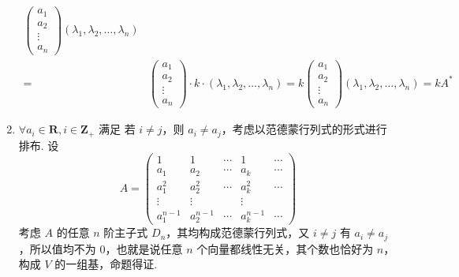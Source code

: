 \begin{enumerate}
\begin{align*}
\begin{pmatrix}
            a_1 \\
            a_2 \\
            \vdots \\
            a_n
        \end{pmatrix} (\lambda_1, \lambda_2, \ldots, \lambda_n) \\ ={} & \begin{pmatrix}
            a_1 \\
            a_2 \\
            \vdots \\
            a_n
        \end{pmatrix} \cdot k \cdot (\lambda_1, \lambda_2, \ldots, \lambda_n) = k \begin{pmatrix}
            a_1 \\
            a_2 \\
            \vdots \\
            a_n
        \end{pmatrix} (\lambda_1, \lambda_2, \ldots, \lambda_n) = kA^*
    \end{align*}
    \item $\forall a_i \in \mathbf{R}, i \in \mathbf{Z}_{+}$ 满足 若 $i \neq j$，则 $a_i \neq a_j$，考虑以范德蒙行列式的形式进行排布. 设 \[ A = \begin{pmatrix}
        1 & 1 & \cdots & 1 & \cdots \\
        a_1 & a_2 & \cdots & a_k & \cdots \\
        a_1^2 & a_2^2 & \cdots & a_k^2 & \cdots \\
        \vdots & \vdots &      & \vdots &       \\
        a_1^{n-1} & a_2^{n-1} & \cdots & a_k^{n-1} & \cdots
    \end{pmatrix}\] 考虑 $A$ 的任意 $n$ 阶主子式 $D_n$，其均构成范德蒙行列式，又 $i \neq j$ 有 $a_i \neq a_j$，所以值均不为 0，也就是说任意 $n$ 个向量都线性无关，其个数也恰好为 $n$，构成 $V$ 的一组基，命题得证.
\end{enumerate}

